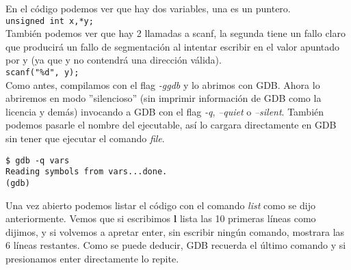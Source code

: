 En el código podemos ver que hay dos variables, una es un puntero.\\ \lstinline|unsigned int x,*y;|\\
También podemos ver que hay 2 llamadas a scanf, la segunda tiene un fallo claro que producirá un fallo de segmentación al intentar escribir en el valor apuntado por y (ya que y no contendrá una dirección válida).\\
\lstinline|scanf("%d", y);|\\
Como antes, compilamos con el flag \emph{-ggdb} y lo abrimos con GDB. Ahora lo abriremos en modo ''silencioso'' (sin imprimir información de GDB como la licencia y demás) invocando a GDB con el flag \emph{-q}, \emph{--quiet} o \emph{--silent}. También podemos pasarle el nombre del ejecutable, así lo cargara directamente en GDB sin tener que ejecutar el comando \emph{file}.
\begin{verbatim}
$ gdb -q vars
Reading symbols from vars...done.
(gdb)
\end{verbatim}
Una vez abierto podemos listar el código con el comando \emph{list} como se dijo anteriormente. Vemos que si escribimos \textbf{l} lista las 10 primeras líneas como dijimos, y si volvemos a apretar enter, sin escribir ningún comando, mostrara las 6 líneas restantes. Como se puede deducir, GDB recuerda el último comando y si presionamos enter directamente lo repite.\\

